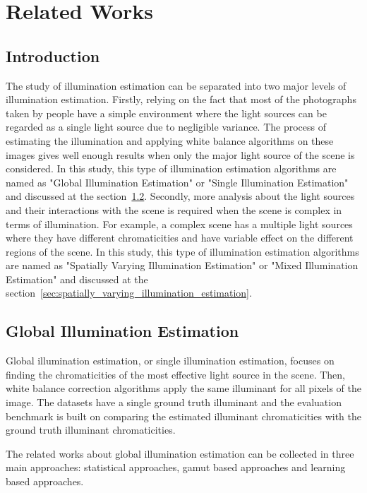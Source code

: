 \chapter{Related Works}
\label{chp:related_works}

\section{Introduction}
\label{sec:related_works_introduction}

 The study of illumination estimation can be separated into two major levels of illumination estimation. Firstly, relying on the fact that most of the photographs taken by people have a simple environment where the light sources can be regarded as a single light source due to negligible variance. The process of estimating the illumination and applying white balance algorithms on these images gives well enough results when only the major light source of the scene is considered. In this study, this type of illumination estimation algorithms are named as "Global Illumination Estimation" or "Single Illumination Estimation" and discussed at the section~\ref{sec:global_illumination_estimation}. Secondly, more analysis about the light sources and their interactions with the scene is required when the scene is complex in terms of illumination. For example, a complex scene has a multiple light sources where they have different chromaticities and have variable effect on the different regions of the scene. In this study, this type of illumination estimation algorithms are named as "Spatially Varying Illumination Estimation" or "Mixed Illumination Estimation" and discussed at the section~\ref{sec:spatially_varying_illumination_estimation}.

\section{Global Illumination Estimation}
\label{sec:global_illumination_estimation}

Global illumination estimation, or single illumination estimation, focuses on finding the chromaticities of the most effective light source in the scene. Then, white balance correction algorithms apply the same illuminant for all pixels of the image. The datasets have a single ground truth illuminant and the evaluation benchmark is built on comparing the estimated illuminant chromaticities with the ground truth illuminant chromaticities.

The related works about global illumination estimation can be collected in three main approaches: statistical approaches, gamut based approaches and learning based approaches.

